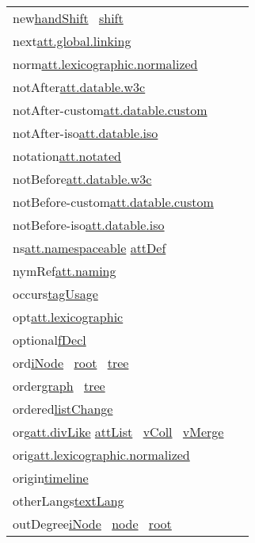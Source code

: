 \begin{longtable}{L{.2\textwidth}P{.8\textwidth}}
new\tabcellsep \hyperref[TEI.handShift]{handShift}  \hyperref[TEI.shift]{shift} \\
next\tabcellsep \hyperref[TEI.att.global.linking]{att.global.linking}\\
norm\tabcellsep \hyperref[TEI.att.lexicographic.normalized]{att.lexicographic.normalized}\\
notAfter\tabcellsep \hyperref[TEI.att.datable.w3c]{att.datable.w3c}\\
notAfter-custom\tabcellsep \hyperref[TEI.att.datable.custom]{att.datable.custom}\\
notAfter-iso\tabcellsep \hyperref[TEI.att.datable.iso]{att.datable.iso}\\
notation\tabcellsep \hyperref[TEI.att.notated]{att.notated}\\
notBefore\tabcellsep \hyperref[TEI.att.datable.w3c]{att.datable.w3c}\\
notBefore-custom\tabcellsep \hyperref[TEI.att.datable.custom]{att.datable.custom}\\
notBefore-iso\tabcellsep \hyperref[TEI.att.datable.iso]{att.datable.iso}\\
ns\tabcellsep \hyperref[TEI.att.namespaceable]{att.namespaceable} \hyperref[TEI.attDef]{attDef} \\
nymRef\tabcellsep \hyperref[TEI.att.naming]{att.naming}\\
occurs\tabcellsep \hyperref[TEI.tagUsage]{tagUsage} \\
opt\tabcellsep \hyperref[TEI.att.lexicographic]{att.lexicographic}\\
optional\tabcellsep \hyperref[TEI.fDecl]{fDecl} \\
ord\tabcellsep \hyperref[TEI.iNode]{iNode}  \hyperref[TEI.root]{root}  \hyperref[TEI.tree]{tree} \\
order\tabcellsep \hyperref[TEI.graph]{graph}  \hyperref[TEI.tree]{tree} \\
ordered\tabcellsep \hyperref[TEI.listChange]{listChange} \\
org\tabcellsep \hyperref[TEI.att.divLike]{att.divLike} \hyperref[TEI.attList]{attList}  \hyperref[TEI.vColl]{vColl}  \hyperref[TEI.vMerge]{vMerge} \\
orig\tabcellsep \hyperref[TEI.att.lexicographic.normalized]{att.lexicographic.normalized}\\
origin\tabcellsep \hyperref[TEI.timeline]{timeline} \\
otherLangs\tabcellsep \hyperref[TEI.textLang]{textLang} \\
outDegree\tabcellsep \hyperref[TEI.iNode]{iNode}  \hyperref[TEI.node]{node}  \hyperref[TEI.root]{root} \\

\end{longtable}
